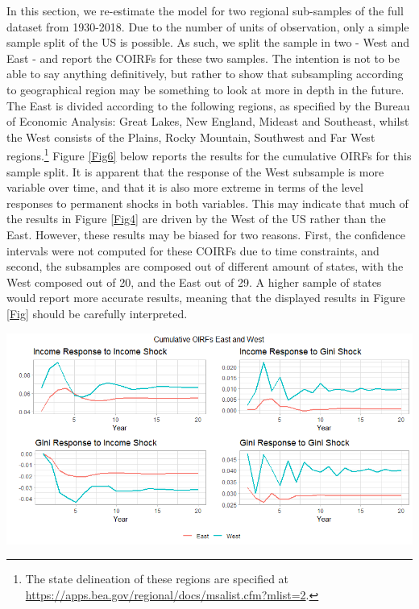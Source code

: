 \documentclass[11pt,preprint, authoryear]{elsarticle}
\let\origfigure\figure
\let\endorigfigure\endfigure
\renewenvironment{figure}[1][2] {
    \expandafter\origfigure\expandafter[H]
} {
    \endorigfigure
}
\numberwithin{equation}{section}
\numberwithin{figure}{section}
\numberwithin{table}{section}
\let\rmarkdownfootnote\footnote%
\def\footnote{\protect\rmarkdownfootnote}
\begin{document}
In this section, we re-estimate the model for two regional sub-samples
of the full dataset from 1930-2018. Due to the number of units of
observation, only a simple sample split of the US is possible. As such,
we split the sample in two - West and East - and report the COIRFs for
these two samples. The intention is not to be able to say anything
definitively, but rather to show that subsampling according to
geographical region may be something to look at more in depth in the
future. The East is divided according to the following regions, as
specified by the Bureau of Economic Analysis: Great Lakes, New England,
Mideast and Southeast, whilst the West consists of the Plains, Rocky
Mountain, Southwest and Far West regions.\footnote{The state delineation
  of these regions are specified at
  \url{https://apps.bea.gov/regional/docs/msalist.cfm?mlist=2}.} Figure
\ref{Fig6} below reports the results for the cumulative OIRFs for this
sample split. It is apparent that the response of the West subsample is
more variable over time, and that it is also more extreme in terms of
the level responses to permanent shocks in both variables. This may
indicate that much of the results in Figure \ref{Fig4} are driven by the
West of the US rather than the East. However, these results may be
biased for two reasons. First, the confidence intervals were not
computed for these COIRFs due to time constraints, and second, the
subsamples are composed out of different amount of states, with the West
composed out of 20, and the East out of 29. A higher sample of states
would report more accurate results, meaning that the displayed results
in Figure \ref{Fig} should be carefully interpreted.

\begin{figure}[H]
\includegraphics[width=1\linewidth]{images/regional_COIRFs} \caption{\label{Fig6}}\label{fig:Fig6}
\end{figure}
\end{document}
